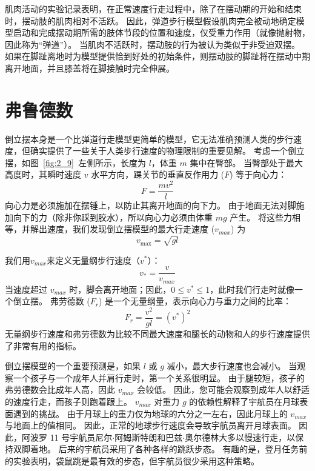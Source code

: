 肌肉活动的实验记录表明，在正常速度行走过程中，除了在摆动期的开始和结束时，摆动肢的肌肉相对不活跃。
因此，弹道步行模型假设肌肉完全被动地确定模型启动和完成摆动期所需的肢体节段的位置和速度，仅受重力作用（就像抛射物，因此称为“弹道”）。
当肌肉不活跃时，摆动肢的行为被认为类似于非受迫双摆。
如果在脚趾离地时为模型提供恰到好处的初始条件，则摆动肢的脚趾将在摆动中期离开地面，并且膝盖将在脚接触时完全伸展。


\section{弗鲁德数}

倒立摆本身是一个比弹道行走模型更简单的模型，它无法准确预测人类的步行速度，但确实提供了一些关于人类步行速度的物理限制的重要见解。
考虑一个倒立摆，如图~\ref{fig:2_9}~左侧所示，长度为 $l$，体重 $m$ 集中在臀部。
当臀部处于最大高度时，其瞬时速度 $v$ 水平方向，踝关节的垂直反作用力 ($F$) 等于向心力：
%
\begin{equation}
	F = \frac{m v^2}{l}
\end{equation}
% 
向心力是必须施加在摆锤上，以防止其离开地面的向下力。
由于地面无法对脚施加向下的力（除非你踩到胶水），所以向心力必须由体重 $mg$ 产生。
将这些力相等，并解出速度，我们发现倒立摆模型的最大行走速度 ($v_{max}$) 为
%
\begin{equation}
	v_{\text{max}} = \sqrt{g l}
\end{equation}

我们用$v_{max}$来定义无量纲步行速度（$v^{*}$）：
\begin{equation}
	v_{*} = \frac{v}{v_{max}}
\end{equation}
%
当速度超过 $v_{max}$ 时，脚会离开地面；因此，$0 \leq v^{*} \leq 1$，此时我们行走时就像一个倒立摆。
弗劳德数 ($F_r$) 是一个无量纲量，表示向心力与重力之间的比率：
%
\begin{equation}
	F_r = \frac{v^2}{g l}
		= (v^{*})^2
\end{equation}
%
无量纲步行速度和弗劳德数为比较不同最大速度和腿长的动物和人的步行速度提供了非常有用的指标。


倒立摆模型的一个重要预测是，如果 $l$ 或 $g$ 减小，最大步行速度也会减小。
当观察一个孩子与一个成年人并肩行走时，第一个关系很明显。
由于腿较短，孩子的弗劳德数会比成年人高，因此 $v_{max}$ 会较低。
因此，您可能会观察到成年人以舒适的速度行走，而孩子则跑着跟上。 
$v_{max}$ 对重力 $g$ 的依赖性解释了宇航员在月球表面遇到的挑战。
由于月球上的重力仅为地球的六分之一左右，因此月球上的 $v_{max}$ 与地面上的值相同。
因此，正常的地球步行速度会导致宇航员离开月球表面。
因此，阿波罗 11 号宇航员尼尔$\cdot$阿姆斯特朗和巴兹$\cdot$奥尔德林大多以慢速行走，以保持双脚着地。
后来的宇航员采用了各种各样的跳跃步态。
有趣的是，登月任务前的实验表明，袋鼠跳是最有效的步态，但宇航员很少采用这种策略。



